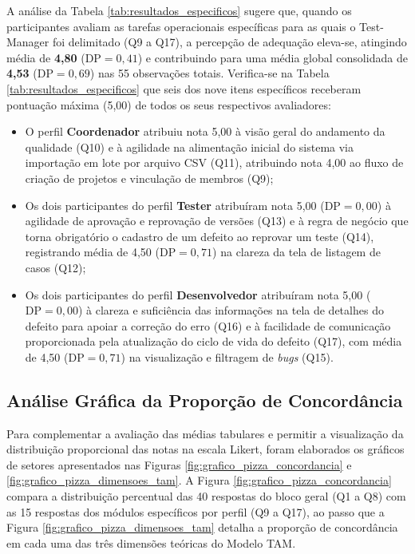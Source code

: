A análise da Tabela \ref{tab:resultados_especificos} sugere que, quando os participantes avaliam as tarefas operacionais específicas para as quais o Test-Manager foi delimitado (Q9 a Q17), a percepção de adequação eleva-se, atingindo média de \textbf{4,80} ($\text{DP} = 0,41$) e contribuindo para uma média global consolidada de \textbf{4,53} ($\text{DP} = 0,69$) nas 55 observações totais. Verifica-se na Tabela \ref{tab:resultados_especificos} que seis dos nove itens específicos receberam pontuação máxima (5,00) de todos os seus respectivos avaliadores:
\begin{itemize}
    \item O perfil \textbf{Coordenador} atribuiu nota 5,00 à visão geral do andamento da qualidade (Q10) e à agilidade na alimentação inicial do sistema via importação em lote por arquivo CSV (Q11), atribuindo nota 4,00 ao fluxo de criação de projetos e vinculação de membros (Q9);
    \item Os dois participantes do perfil \textbf{Tester} atribuíram nota 5,00 ($\text{DP} = 0,00$) à agilidade de aprovação e reprovação de versões (Q13) e à regra de negócio que torna obrigatório o cadastro de um defeito ao reprovar um teste (Q14), registrando média de 4,50 ($\text{DP} = 0,71$) na clareza da tela de listagem de casos (Q12);
    \item Os dois participantes do perfil \textbf{Desenvolvedor} atribuíram nota 5,00 ($\text{DP} = 0,00$) à clareza e suficiência das informações na tela de detalhes do defeito para apoiar a correção do erro (Q16) e à facilidade de comunicação proporcionada pela atualização do ciclo de vida do defeito (Q17), com média de 4,50 ($\text{DP} = 0,71$) na visualização e filtragem de \textit{bugs} (Q15).
\end{itemize}

\subsection{Análise Gráfica da Proporção de Concordância}

Para complementar a avaliação das médias tabulares e permitir a visualização da distribuição proporcional das notas na escala Likert, foram elaborados os gráficos de setores apresentados nas Figuras \ref{fig:grafico_pizza_concordancia} e \ref{fig:grafico_pizza_dimensoes_tam}. A Figura \ref{fig:grafico_pizza_concordancia} compara a distribuição percentual das 40 respostas do bloco geral (Q1 a Q8) com as 15 respostas dos módulos específicos por perfil (Q9 a Q17), ao passo que a Figura \ref{fig:grafico_pizza_dimensoes_tam} detalha a proporção de concordância em cada uma das três dimensões teóricas do Modelo TAM.

